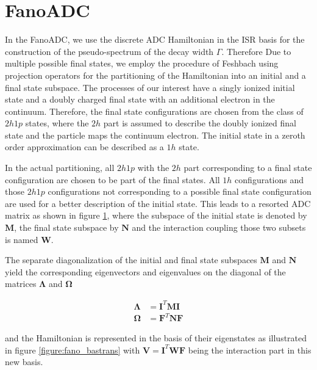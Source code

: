 \section{FanoADC}
In the FanoADC, we use the discrete ADC Hamiltonian in the \ac{ISR}
basis for the construction of the pseudo-spectrum of the decay width
$\Gamma$.
Therefore
Due to multiple possible final states, we employ the procedure
of Feshbach using projection operators for the partitioning of the Hamiltonian
into an initial and a final state subspace.
The processes of our interest have a singly ionized initial state and a
doubly charged final state with an additional electron in the continuum.
Therefore, the final state configurations are chosen from
the class of $2h1p$ states, where the $2h$ part is assumed to
describe the doubly ionized final state and the particle maps the continuum electron.
The initial state in a zeroth order approximation can be described as a $1h$ state.

In the actual partitioning, all $2h1p$ with the $2h$ part corresponding to
a final state configuration are chosen to be part of the final states.
All $1h$ configurations and those $2h1p$ configurations not corresponding
to a possible final state configuration are used for a better description
of the initial state. This leads to a resorted \ac{ADC} matrix as shown in
figure \ref{figure:fano_matsort}, where the subspace of the initial state
is denoted by $\mathbf{M}$, the final state subspace by $\mathbf{N}$ and
the interaction coupling those two subsets is named $\mathbf{W}$.

\begin{figure}[h]
  \centering
  
  \caption{}
  \label{figure:fano_matsort}
\end{figure}

The separate diagonalization of the initial and final state subspaces
$\mathbf{M}$ and $\mathbf{N}$ yield
the corresponding eigenvectors and eigenvalues on the diagonal of the
matrices $\mathbf{\Lambda}$ and $\mathbf{\Omega}$

\begin{align}
  \mathbf{\Lambda} &= \mathbf{I}^T \mathbf{M} \mathbf{I}  \\
  \mathbf{\Omega}  &= \mathbf{F}^T \mathbf{N} \mathbf{F} 
\end{align}

and the Hamiltonian is represented in the basis of their eigenstates
as illustrated in
figure \ref{figure:fano_bastrans} with $\mathbf{V} = \mathbf{I}^T \mathbf{W} \mathbf{F}$
being the interaction part
in this new basis.


